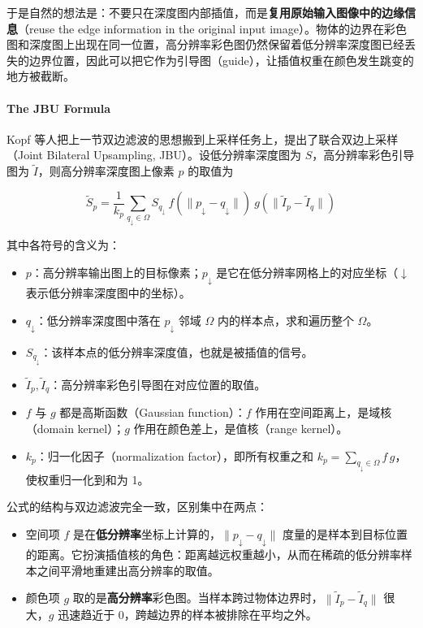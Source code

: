 于是自然的想法是：不要只在深度图内部插值，而是\textbf{复用原始输入图像中的边缘信息}（reuse the edge information in the original input image）。物体的边界在彩色图和深度图上出现在同一位置，高分辨率彩色图仍然保留着低分辨率深度图已经丢失的边界位置，因此可以把它作为引导图（guide），让插值权重在颜色发生跳变的地方被截断。

\paragraph{The JBU Formula}

Kopf 等人把上一节双边滤波的思想搬到上采样任务上，提出了联合双边上采样（Joint Bilateral Upsampling, JBU）。设低分辨率深度图为 $S$，高分辨率彩色引导图为 $\tilde I$，则高分辨率深度图上像素 $p$ 的取值为

\[
\tilde S_p = \frac{1}{k_p}\sum_{q_\downarrow\in\Omega} S_{q_\downarrow}\ f(\|p_\downarrow - q_\downarrow\|)\ g(\|\tilde I_p - \tilde I_q\|)
\]

其中各符号的含义为：

\begin{itemize}
    \item $p$：高分辨率输出图上的目标像素；$p_\downarrow$ 是它在低分辨率网格上的对应坐标（$\downarrow$ 表示低分辨率深度图中的坐标）。
    \item $q_\downarrow$：低分辨率深度图中落在 $p_\downarrow$ 邻域 $\Omega$ 内的样本点，求和遍历整个 $\Omega$。
    \item $S_{q_\downarrow}$：该样本点的低分辨率深度值，也就是被插值的信号。
    \item $\tilde I_p,\tilde I_q$：高分辨率彩色引导图在对应位置的取值。
    \item $f$ 与 $g$ 都是高斯函数（Gaussian function）：$f$ 作用在空间距离上，是域核（domain kernel）；$g$ 作用在颜色差上，是值核（range kernel）。
    \item $k_p$：归一化因子（normalization factor），即所有权重之和 $k_p=\sum_{q_\downarrow\in\Omega} f\,g$，使权重归一化到和为 1。
\end{itemize}

公式的结构与双边滤波完全一致，区别集中在两点：

\begin{itemize}
    \item 空间项 $f$ 是在\textbf{低分辨率}坐标上计算的，$\|p_\downarrow-q_\downarrow\|$ 度量的是样本到目标位置的距离。它扮演插值核的角色：距离越远权重越小，从而在稀疏的低分辨率样本之间平滑地重建出高分辨率的取值。
    \item 颜色项 $g$ 取的是\textbf{高分辨率}彩色图。当样本跨过物体边界时，$\|\tilde I_p-\tilde I_q\|$ 很大，$g$ 迅速趋近于 0，跨越边界的样本被排除在平均之外。
\end{itemize}

